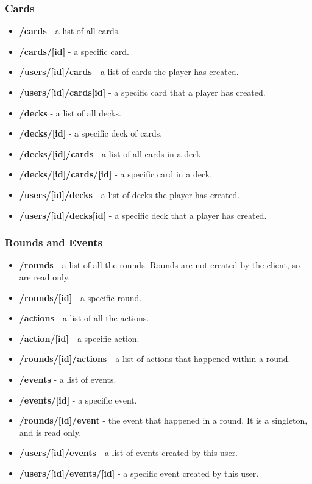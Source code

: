 \subsubsection{Cards}
\begin{itemize}
	\item \textbf{/cards} - a list of all cards.
	\item \textbf{/cards/[id]} - a specific card.
	\item \textbf{/users/[id]/cards} - a list of cards the player has created.
	\item \textbf{/users/[id]/cards[id]} - a specific card that a player has created.
	\item \textbf{/decks} - a list of all decks.
	\item \textbf{/decks/[id]} - a specific deck of cards.
	\item \textbf{/decks/[id]/cards} - a list of all cards in a deck.
	\item \textbf{/decks/[id]/cards/[id]} - a specific card in a deck.
	\item \textbf{/users/[id]/decks} - a list of decks the player has created.
	\item \textbf{/users/[id]/decks[id]} - a specific deck that a player has created.
\end{itemize}

\subsubsection{Rounds and Events}
\begin{itemize}
	\item \textbf{/rounds} - a list of all the rounds. Rounds are not created by the client, so are read only.
	\item \textbf{/rounds/[id]} - a specific round.
	\item \textbf{/actions} - a list of all the actions.
	\item \textbf{/action/[id]} - a specific action.
	\item \textbf{/rounds/[id]/actions} - a list of actions that happened within a round.
	\item \textbf{/events} - a list of events.
	\item \textbf{/events/[id]} - a specific event.
	\item \textbf{/rounds/[id]/event} - the event that happened in a round. It is a singleton, and is read only.
	\item \textbf{/users/[id]/events} - a list of events created by this user.
	\item \textbf{/users/[id]/events/[id]} - a specific event created by this user.
\end{itemize}

